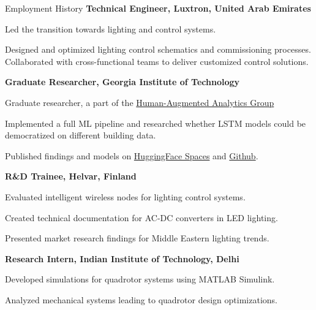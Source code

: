 \begin{rubric}{Employment History}
%
%
%
%
    \textbf{Technical Engineer, Luxtron, United Arab Emirates}\par
    Led the transition towards lighting and control systems.\par
    Designed and optimized lighting control schematics and commissioning processes. Collaborated with cross-functional teams to deliver customized control solutions.
    
%
    \textbf{Graduate Researcher, Georgia Institute of Technology}\par
    Graduate researcher, a part of the \href{https://sites.gatech.edu/human-augmented-analytics-group/}{Human-Augmented Analytics Group}\par
    Implemented a full ML pipeline and researched whether LSTM models could be democratized on different building data.\par
    Published findings and models on \href{https://huggingface.co/spaces/GaTech-NREL/LSTM-forecaster}{HuggingFace Spaces} and \href{https://github.com/nkapila6/lstm-bgd2}{Github}.

%
    \textbf{R\&D Trainee, Helvar, Finland}\par
    Evaluated intelligent wireless nodes for lighting control systems.\par
    Created technical documentation for AC-DC converters in LED lighting.\par
    Presented market research findings for Middle Eastern lighting trends.

\entry*[2017 -- 2018]%
    \textbf{Research Intern, Indian Institute of Technology, Delhi}\par
    Developed simulations for quadrotor systems using MATLAB Simulink.\par
    Analyzed mechanical systems leading to quadrotor design optimizations.
\end{rubric}